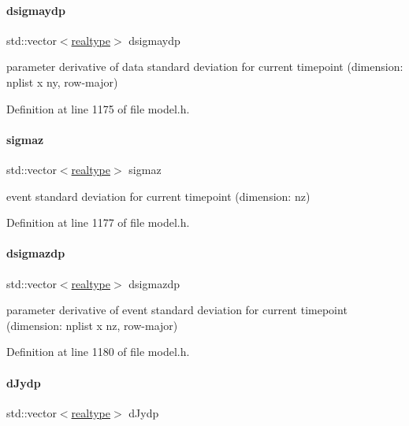\paragraph{\texorpdfstring{dsigmaydp}{dsigmaydp}}
{\footnotesize\ttfamily std\+::vector$<$\mbox{\hyperlink{namespaceamici_a1bdce28051d6a53868f7ccbf5f2c14a3}{realtype}}$>$ dsigmaydp}

parameter derivative of data standard deviation for current timepoint (dimension\+: nplist x ny, row-\/major) 

Definition at line 1175 of file model.\+h.

\mbox{\label{classamici_1_1_model_adc3c5ee1620b079cd34137010873f500}} 
\paragraph{\texorpdfstring{sigmaz}{sigmaz}}
{\footnotesize\ttfamily std\+::vector$<$\mbox{\hyperlink{namespaceamici_a1bdce28051d6a53868f7ccbf5f2c14a3}{realtype}}$>$ sigmaz}

event standard deviation for current timepoint (dimension\+: nz) 

Definition at line 1177 of file model.\+h.

\mbox{\label{classamici_1_1_model_aae09fc37aa5eb7b2ba0e9bb335940fd5}} 
\paragraph{\texorpdfstring{dsigmazdp}{dsigmazdp}}
{\footnotesize\ttfamily std\+::vector$<$\mbox{\hyperlink{namespaceamici_a1bdce28051d6a53868f7ccbf5f2c14a3}{realtype}}$>$ dsigmazdp}

parameter derivative of event standard deviation for current timepoint (dimension\+: nplist x nz, row-\/major) 

Definition at line 1180 of file model.\+h.

\mbox{\label{classamici_1_1_model_a6cabcac49200072c8efd301339f5f445}} 
\paragraph{\texorpdfstring{dJydp}{dJydp}}
{\footnotesize\ttfamily std\+::vector$<$\mbox{\hyperlink{namespaceamici_a1bdce28051d6a53868f7ccbf5f2c14a3}{realtype}}$>$ d\+Jydp}

